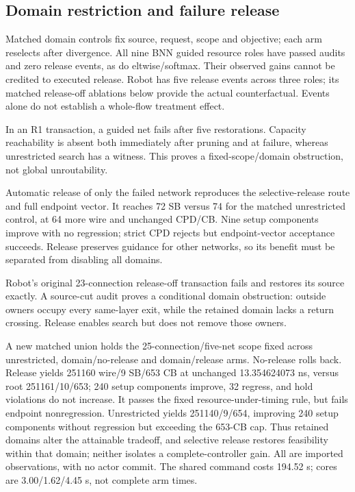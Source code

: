 \documentclass[conference,10pt]{IEEEtran}
\begin{document}
\subsection{Domain restriction and failure release}
Matched domain controls fix source, request, scope and objective; each arm reselects after divergence. All nine BNN guided resource roles have passed audits and zero release events, as do eltwise/softmax. Their observed gains cannot be credited to executed release. Robot has five release events across three roles; its matched release-off ablations below provide the actual counterfactual. Events alone do not establish a whole-flow treatment effect.

In an R1 transaction, a guided net fails after five restorations. Capacity reachability is absent both immediately after pruning and at failure, whereas unrestricted search has a witness. This proves a fixed-scope/domain obstruction, not global unroutability.

Automatic release of only the failed network reproduces the selective-release route and full endpoint vector. It reaches 72 SB versus 74 for the matched unrestricted control, at 64 more wire and unchanged CPD/CB. Nine setup components improve with no regression; strict CPD rejects but endpoint-vector acceptance succeeds. Release preserves guidance for other networks, so its benefit must be separated from disabling all domains.

Robot's original 23-connection release-off transaction fails and restores its source exactly. A source-cut audit proves a conditional domain obstruction: outside owners occupy every same-layer exit, while the retained domain lacks a return crossing. Release enables search but does not remove those owners.

A new matched union holds the 25-connection/five-net scope fixed across unrestricted, domain/no-release and domain/release arms. No-release rolls back. Release yields 251160 wire/9 SB/653 CB at unchanged 13.354624073 ns, versus root 251161/10/653; 240 setup components improve, 32 regress, and hold violations do not increase. It passes the fixed resource-under-timing rule, but fails endpoint nonregression. Unrestricted yields 251140/9/654, improving 240 setup components without regression but exceeding the 653-CB cap. Thus retained domains alter the attainable tradeoff, and selective release restores feasibility within that domain; neither isolates a complete-controller gain. All are imported observations, with no actor commit. The shared command costs 194.52 s; cores are 3.00/1.62/4.45 s, not complete arm times.
\end{document}
